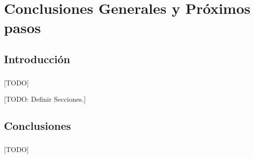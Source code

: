 \documentclass{subfiles}
\begin{document}
  \chapter{Conclusiones Generales y Próximos pasos}
  \label{chap:conclusions}

    \section{Introducción}
    \label{sec:conclusion_introduction}

      \paragraph{}
      [TODO]

    [TODO: Definir Secciones.]

    \section{Conclusiones}
    \label{sec:conclusion_conclusions}

      \paragraph{}
      [TODO]
\end{document}
